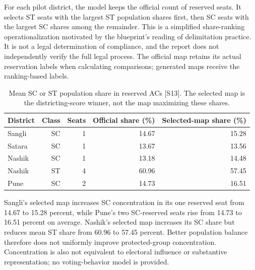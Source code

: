 \documentclass[11pt,a4paper,oneside]{report}
\newcommand{\source}[1]{\par\nopagebreak[4]{\footnotesize\color{teal}Evidence: #1.}\par}
\begin{document}
For each pilot district, the model keeps the official count of reserved seats. It selects ST seats with the largest ST population shares first, then SC seats with the largest SC shares among the remainder. This is a simplified share-ranking operationalization motivated by the blueprint's reading of delimitation practice. It is not a legal determination of compliance, and the report does not independently verify the full legal process. The official map retains its actual reservation labels when calculating comparisons; generated maps receive the ranking-based labels.
\begin{table}[htbp]\centering
\small
\setlength{\tabcolsep}{5pt}
\caption{Mean SC or ST population share in reserved ACs [S13]. The selected map is the districting-score winner, not the map maximizing these shares.}
\begin{tabular}{lrrrr}
\toprule
District & Class & Seats & Official share (\%) & Selected-map share (\%)\\
\midrule
Sangli & SC & 1 & 14.67 & 15.28\\
Satara & SC & 1 & 13.67 & 13.56\\
Nashik & SC & 1 & 13.18 & 14.48\\
Nashik & ST & 4 & 60.96 & 57.45\\
Pune & SC & 2 & 14.73 & 16.51\\
\bottomrule\end{tabular}
\end{table}
Sangli's selected map increases SC concentration in its one reserved seat from 14.67 to 15.28 percent, while Pune's two SC-reserved seats rise from 14.73 to 16.51 percent on average. Nashik's selected map increases its SC share but reduces mean ST share from 60.96 to 57.45 percent. Better population balance therefore does not uniformly improve protected-group concentration. Concentration is also not equivalent to electoral influence or substantive representation; no voting-behavior model is provided.
\source{[S13]}
\end{document}
